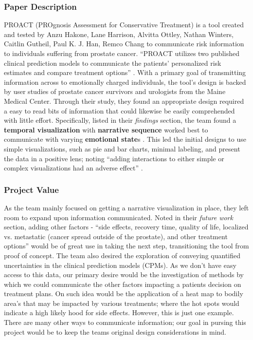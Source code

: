 \documentclass[journal]{vgtc}                %
\begin{document}
        \subsubsection{Paper Description}
        PROACT (PROgnosis Assessment for Conservative Treatment) is a tool created and tested by Anzu Hakone, Lane Harrison, Alvitta Ottley, Nathan Winters, Caitlin Gutheil, Paul K. J. Han, Remco Chang to communicate risk information to individuals suffering from prostate cancer.
        ``PROACT utilizes two published clinical prediction models to communicate the patients’ personalized risk estimates and compare treatment options'' \cite[p.~1]{PROACT:2016}.
        With a primary goal of transmitting information across to emotionally charged individuals, the tool's design is backed by user studies of prostate cancer survivors and urologists from the Maine Medical Center.
        Through their study, they found an appropriate design required a easy to read bits of information that could likewise be easily comprehended with little effort.
        Specifically, listed in their \textit{findings} section, the team found a \textbf{temporal visualization} with \textbf{narrative sequence} worked best to communicate with varying \textbf{emotional state}s \cite[p.~8]{PROACT:2016}.
        This led the initial designs to use simple visualizations, such as pie and bar charts, minimal labeling, and present the data in a positive lens; noting ``adding interactions to either simple or complex visualizations had an adverse effect'' \cite[p.~2]{PROACT:2016}.

        \subsubsection{Project Value}
        As the team mainly focused on getting a narrative visualization in place, they left room to expand upon information communicated.
        Noted in their \textit{future work} section, adding other factors - ``side effects, recovery time, quality of life, localized vs. metastatic (cancer spread outside of the prostate), and other treatment options'' \cite[p.~9]{PROACT:2016} would be of great use in taking the next step, transitioning the tool from proof of concept.
        The team also desired the exploration of conveying quantified uncertainties in the clinical prediction models (CPMs).
        As we don't have easy access to this data, our primary desire would be the investigation of methods by which we could communicate the other factors impacting a patients decision on treatment plans.
        On such idea would be the application of a heat map to bodily area's that may be impacted by various treatments; where the hot spots would indicate a high likely hood for side effects.
        However, this is just one example.
        There are many other ways to communicate information; our goal in pursing this project would be to keep the teams original design considerations in mind.
\end{document}
